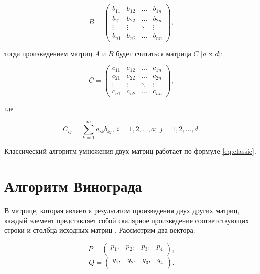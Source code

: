 \begin{equation}
B = \left(
\begin{array}{cccc}
b_{11} & b_{12} & \ldots & b_{1n}\\
b_{21} & b_{22} & \ldots & b_{2n}\\
\vdots & \vdots & \ddots & \vdots\\
b_{n1} & b_{n2} & \ldots & b_{nn}
\end{array}
\right),
\end{equation}

тогда произведением матриц $A$ и $B$ будет считаться матрица $C$ [$a$ x $d$]:

\begin{equation}
C = \left(
\begin{array}{cccc}
c_{11} & c_{12} & \ldots & c_{1n}\\
c_{21} & c_{22} & \ldots & c_{2n}\\
\vdots & \vdots & \ddots & \vdots\\
c_{n1} & c_{n2} & \ldots & c_{nn}
\end{array}
\right),
\end{equation}

где

\begin{equation}
\label{eq:classic}
    C_{ij} = \sum\limits_{k=1}^m a_{ik}b_{kj},\ i = 1, 2, ..., a;\ j = 1, 2, ..., d. 
\end{equation}

Классический алгоритм умножения двух матриц работает по формуле \ref{eq:classic}.

\section{Алгоритм Винограда}
В матрице, которая является результатом произведения двух других матриц, каждый элемент представляет собой скалярное произведение соответствующих строки и столбца исходных матриц \cite{vinograd}. 
Рассмотрим два вектора:

\begin{equation}
P = \left(
\begin{array}{cccc}
p_{1}, & p_{2}, & p_{3}, & p_{4}\\
\end{array}
\right),
\end{equation}
\begin{equation}
Q = \left(
\begin{array}{cccc}
q_{1}, & q_{2}, & q_{3}, & q_{4}\\
\end{array}
\right).
\end{equation}

